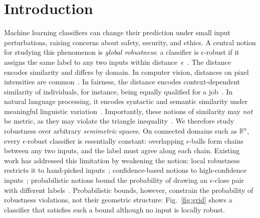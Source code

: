 \section{Introduction}

Machine learning classifiers can change their prediction under small input perturbations, raising concerns about safety, security, and ethics. 
A central notion for studying this phenomenon is \emph{global robustness}:
 a classifier is $\epsilon$-robust if it assigns the same label to any two inputs within
distance~$\epsilon$~\cite{casadio2022neural}. 
The distance encodes similarity and differs by domain. 
In computer vision, distances on pixel intensities are common~\cite{wang2026survey}. 
In fairness, the distance encodes context-dependent similarity of individuals, for instance, being equally qualified for a job~\cite{fairness-landscape,kusner2017counterfactual,ranking-fairness}.
In natural language processing, it encodes syntactic and semantic similarity under meaningful linguistic variation~\cite{levy2025statistical}.
Importantly, these notions of similarity may \emph{not} be metric, as they may violate the triangle inequality~\cite{garcia2019learning,similarity-guide}.
We therefore study robustness over arbitrary \emph{semimetric} spaces.
On connected domains such as $\mathbb{R}^n$, every $\epsilon$-robust classifier
is essentially constant: overlapping $\epsilon$-balls form chains between any two inputs,
and the label must agree along each chain.
Existing work has addressed this limitation by weakening the notion: 
local robustness restricts it to hand-picked
inputs~\cite{li2024certifying}; confidence-based notions to high-confidence
inputs~\cite{athavale2024verifying,leino2021globally}; probabilistic notions bound the probability of
drawing an $\epsilon$-close pair with different labels~\cite{mangal2019robustness,levy2023groma}.
Probabilistic bounds, however, constrain  the probability of robustness violations, not their geometric structure: Fig.~\ref{fig:grid} shows a classifier that satisfies such a
bound although no input is locally robust.

